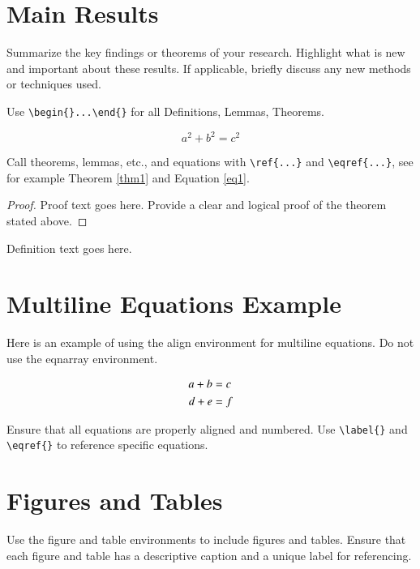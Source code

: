 \documentclass[JMCS, accept]{resources/ISRP}
\begin{document}
\section{Main Results}
\label{sec:results}
 Summarize the key findings or theorems of your research. Highlight what is new and important about these results. If applicable, briefly discuss any new methods or techniques used.

\begin{theorem}\label{thm1}%
	Use \verb|\begin{}...\end{}| for all Definitions, Lemmas, Theorems.
	
	\begin{equation}\label{eq1}
		a^2+b^2=c^2
	\end{equation}
\end{theorem}
 Call theorems, lemmas, etc., and equations with \verb|\ref{...}| and \verb|\eqref{...}|, see for example Theorem \ref{thm1} and Equation \eqref{eq1}. 

\begin{proof}
	Proof text goes here. Provide a clear and logical proof of the theorem stated above.
\end{proof}

\begin{definition}\label{def1}%
	Definition text goes here.
\end{definition}


\section{Multiline Equations Example}
\label{sec:align-example}
 Here is an example of using the align environment for multiline equations. Do not use the eqnarray environment.

\begin{align}
	\aligned
	a + b &= c \\
	d + e &= f
	\endaligned
\end{align}

 Ensure that all equations are properly aligned and numbered. Use \verb|\label{}| and \verb|\eqref{}| to reference specific equations.

\section{Figures and Tables}
\label{sec:figures-tables}
 Use the figure and table environments to include figures and tables. Ensure that each figure and table has a descriptive caption and a unique label for referencing.
\end{document}
